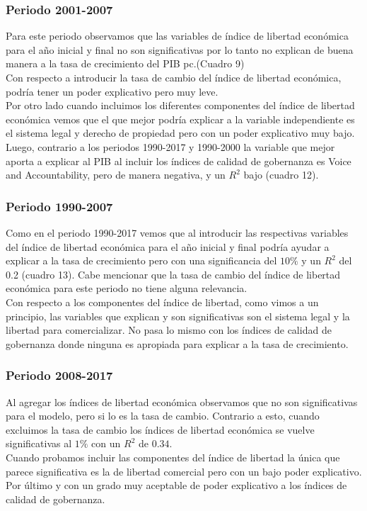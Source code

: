 	    \subsubsection*{Periodo 2001-2007}
		
		Para este periodo observamos que las variables de índice de libertad económica para el año inicial y final no son significativas por lo tanto no explican de buena manera a la tasa de crecimiento del PIB pc.(Cuadro 9)\\
		Con respecto a introducir la tasa de cambio del índice de libertad económica, podría tener un poder explicativo pero muy leve.\\
		Por otro lado cuando incluimos los diferentes componentes del índice de libertad económica vemos que el que mejor podría explicar a la variable independiente es el sistema legal y derecho de propiedad pero con un poder explicativo muy bajo.\\
		Luego, contrario a los periodos 1990-2017 y 1990-2000 la variable que mejor aporta a explicar al PIB al incluir los índices de calidad de gobernanza es Voice and Accountability, pero de manera negativa, y un $R^2$ bajo (cuadro 12).\\

	    \subsubsection*{Periodo 1990-2007}
	    
		Como en el periodo 1990-2017 vemos que al introducir las respectivas variables del índice de libertad económica para el año inicial y final podría ayudar a explicar a la tasa de crecimiento pero con una significancia del $10\%$ y un $R^2$ del 0.2 (cuadro 13). Cabe mencionar que la tasa de cambio del índice de libertad económica para este periodo no tiene alguna relevancia.\\
		Con respecto a los componentes del índice de libertad, como vimos a un principio, las variables que explican y son significativas son el sistema legal y la libertad para comercializar. No pasa lo mismo con los índices de calidad de gobernanza donde ninguna es apropiada para explicar a la tasa de crecimiento.


	    \subsubsection*{Periodo 2008-2017}

		Al agregar los índices de libertad económica observamos que no son significativas para el modelo, pero si lo es la tasa de cambio. Contrario a esto, cuando excluimos la tasa de cambio los índices de libertad económica se vuelve significativas al $1\%$ con un $R^2$ de $0.34$.\\
		Cuando probamos incluir las componentes del índice de libertad la única que parece significativa es la de libertad comercial pero con un bajo poder explicativo.\\
		Por último y con un grado muy aceptable de poder explicativo a los índices de calidad de gobernanza.



